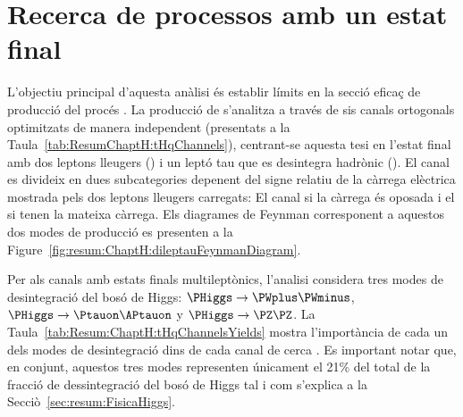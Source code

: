 \FloatBarrier
\section{Recerca de processos \tHq amb un estat final \dileptau}
\label{chap:resumen_val:tHq}
L'objectiu principal d'aquesta anàlisi és establir límits en la secció eficaç de producció del procés \tHq. 
La producció de \tHq s'analitza a través de sis canals ortogonals optimitzats de manera independent 
(presentats a la Taula~\ref{tab:ResumChaptH:tHqChannels}),
centrant-se aquesta tesi en l'estat final amb dos leptons lleugers (\emu) i un leptó tau que es desintegra hadrònic (\tauhad).
El canal \dileptau es divideix en dues subcategories depenent
del signe relatiu de la càrrega elèctrica mostrada pels dos leptons lleugers carregats: El canal \dilepOStau si la càrrega és oposada
i el \dilepSStau si tenen la mateixa càrrega. Els diagrames de Feynman corresponent a aquestos dos modes de producció es
presenten a la Figure~\ref{fig:resum:ChaptH:dileptauFeynmanDiagram}. 


Per als canals amb estats finals multileptònics, l'analisi considera tres modes de desintegració
del bosó de Higgs: $\PHiggs \rightarrow \PWplus\PWminus$,  
$\PHiggs \rightarrow  \Ptauon \APtauon$ y $\PHiggs \rightarrow  \PZ\PZ$. 
La Taula~\ref{tab:Resum:ChaptH:tHqChannelsYields} mostra l'importància de 
cada un dels modes de desintegració dins de cada canal de cerca \tHq. 
Es important notar que, en conjunt, aquestos tres modes
representen únicament el 21\% del total de la fracció de dessintegració del bosó de Higgs
tal i com s'explica a la Secciò~\ref{sec:resum:FisicaHiggs}.


